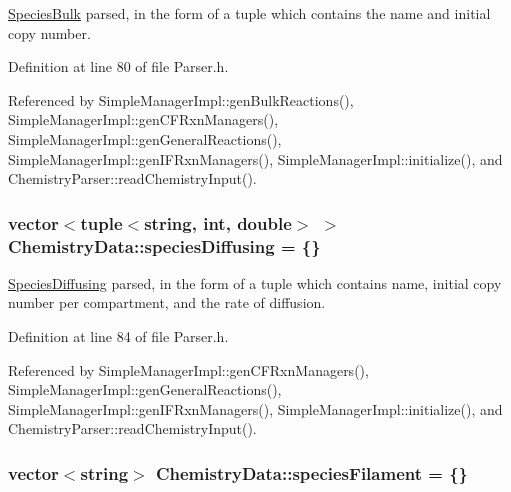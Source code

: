 \hyperlink{classSpeciesBulk}{Species\+Bulk} parsed, in the form of a tuple which contains the name and initial copy number. 



Definition at line 80 of file Parser.\+h.



Referenced by Simple\+Manager\+Impl\+::gen\+Bulk\+Reactions(), Simple\+Manager\+Impl\+::gen\+C\+F\+Rxn\+Managers(), Simple\+Manager\+Impl\+::gen\+General\+Reactions(), Simple\+Manager\+Impl\+::gen\+I\+F\+Rxn\+Managers(), Simple\+Manager\+Impl\+::initialize(), and Chemistry\+Parser\+::read\+Chemistry\+Input().

\hypertarget{structChemistryData_acf21fd3143fa3bc4e0e1097ce15cb77c}{
\subsubsection[{species\+Diffusing}]{\setlength{\rightskip}{0pt plus 5cm}vector$<$tuple$<$string, int, double$>$ $>$ Chemistry\+Data\+::species\+Diffusing = \{\}}}\label{structChemistryData_acf21fd3143fa3bc4e0e1097ce15cb77c}


\hyperlink{classSpeciesDiffusing}{Species\+Diffusing} parsed, in the form of a tuple which contains name, initial copy number per compartment, and the rate of diffusion. 



Definition at line 84 of file Parser.\+h.



Referenced by Simple\+Manager\+Impl\+::gen\+C\+F\+Rxn\+Managers(), Simple\+Manager\+Impl\+::gen\+General\+Reactions(), Simple\+Manager\+Impl\+::gen\+I\+F\+Rxn\+Managers(), Simple\+Manager\+Impl\+::initialize(), and Chemistry\+Parser\+::read\+Chemistry\+Input().

\hypertarget{structChemistryData_a3389b17268aaefcba28539ec3b5e5e35}{
\subsubsection[{species\+Filament}]{\setlength{\rightskip}{0pt plus 5cm}vector$<$string$>$ Chemistry\+Data\+::species\+Filament = \{\}}}\label{structChemistryData_a3389b17268aaefcba28539ec3b5e5e35}


